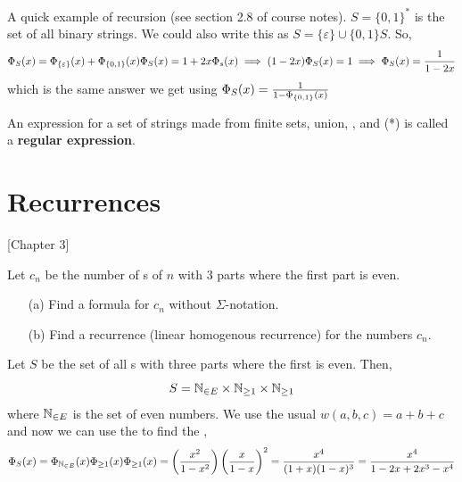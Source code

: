 \documentclass[english, 11pt]{article}
\begin{document}
       \begin{exmp}
         A quick example of recursion (see section 2.8 of course notes). $S = \{0,1\}^*$ is the set of all binary strings. We could also write this as $S = \{\varepsilon\} \cup \{0,1\}S$. So,
         \[ \Phi_S(x) = \Phi_{\{\varepsilon\}}(x) + \Phi_{\{0,1\}}(x)\Phi_S(x) = 1 + 2x\Phi_s(x) \implies (1-2x)\Phi_S(x) = 1 \implies \Phi_S(x) = \frac{1}{1-2x} \]
         which is the same answer we get using $\Phi_S(x) = \frac{1}{1-\Phi_{\{0,1\}}(x)}$
       \end{exmp}

       An expression for a set of strings made from finite sets, union, , and  (*) is called a \textbf{regular expression}.

       \section{Recurrences}[Chapter 3]

       Let $c_n$ be the number of s of $n$ with 3 parts where the first part is even.

       \begin{itemize}
         \item[(a)] Find a formula for $c_n$ without $\Sigma$-notation.
         \item[(b)] Find a recurrence (linear homogenous recurrence) for the numbers $c_n$.
       \end{itemize}

       Let $S$ be the set of all s with three parts where the first is even. Then,
       \[ S = {\mathbb{N}}_{\in E} \times {\mathbb{N}}_{\geq1} \times  {\mathbb{N}}_{\geq1}\]
       where ${\mathbb{N}}_{\in E}$ is the set of even numbers. We use the usual  $w(a,b,c) = a + b + c$ and now we can use the  to find the ,
       \[ \Phi_S(x) = \Phi_{{\mathbb{N}}_{\in E}}(x)\Phi_{\geq 1}(x)\Phi_{\geq 1}(x) = \left( \frac{x^2}{1-x^2} \right)\left( \frac{x}{1-x} \right)^2 = \frac{x^4}{(1+x)(1-x)^3} = \frac{x^4}{1-2x+2x^3-x^4} \]
\end{document}
